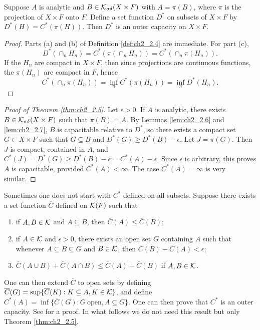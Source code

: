 \begin{lemma}\label{lem:ch2_2.7}
Suppose $A$ is analytic and $B \in \mathcal{K}_{\sigma\delta}(X \times F)$ with $A = \pi(B)$, where $\pi$ is the projection of $X \times F$ onto $F$. Define a set function $D^*$ on subsets of $X \times F$ by $D^*(H) = C^*(\pi(H))$. Then $D^*$ is an outer capacity on $X \times F$.
\end{lemma}

\begin{proof}
Parts (a) and (b) of Definition \ref{def:ch2_2.4} are immediate. For part (c),
\[
    D^*(\cap_n H_n) = C^*(\pi(\cap_n H_n)) = C^*(\cap_n \pi(H_n)).
\]
If the $H_n$ are compact in $X \times F$, then since projections are continuous functions, the $\pi(H_n)$ are compact in $F$, hence
\[
    C^*(\cap_n \pi(H_n)) = \inf_n C^*(\pi(H_n)) = \inf_n D^*(H_n).
\]
\end{proof}

\begin{proof}[Proof of Theorem \ref{thm:ch2_2.5}]
Let $\epsilon > 0$. If $A$ is analytic, there exists $B \in \mathcal{K}_{\sigma\delta}(X \times F)$ such that $\pi(B) = A$. By Lemmas \ref{lem:ch2_2.6} and \ref{lem:ch2_2.7}, $B$ is capacitable relative to $D^*$, so there exists a compact set $G \subset X \times F$ such that $G \subseteq B$ and $D^*(G) \geq D^*(B) - \epsilon$. Let $J = \pi(G)$. Then $J$ is compact, contained in $A$, and $C^*(J) = D^*(G) \geq D^*(B) - \epsilon = C^*(A) - \epsilon$. Since $\epsilon$ is arbitrary, this proves $A$ is capacitable, provided $C^*(A) < \infty$. The case $C^*(A) = \infty$ is very similar.
\end{proof}

Sometimes one does not start with $C^*$ defined on all subsets. Suppose there exists a set function $\overline{C}$ defined on $\mathcal{K}(F)$ such that
\begin{enumerate}
    \item if $A,B \in \mathcal{K}$ and $A \subseteq B$, then $\overline{C}(A) \leq \overline{C}(B)$;
    \item if $A \in \mathcal{K}$ and $\epsilon > 0$, there exists an open set $G$ containing $A$ such that whenever $A \subseteq B \subseteq G$ and $B \in \mathcal{K}$, then $\overline{C}(B) - \overline{C}(A) < \epsilon$;
    \item $\overline{C}(A \cup B) + \overline{C}(A \cap B) \leq \overline{C}(A) + \overline{C}(B)$ if $A,B \in \mathcal{K}$.
\end{enumerate}

One can then extend $\overline{C}$ to open sets by defining $\overline{C}(G) = \sup\{\overline{C}(K) : K \subseteq A, K \in \mathcal{K}\}$, and define $C^*(A) = \inf\{\overline{C}(G) : G~\text{open}, A \subseteq G\}$. One can then prove that $C^*$ is an outer capacity. See \cite{BlumenthalGetoor1968} for a proof. In what follows we do not need this result but only Theorem \ref{thm:ch2_2.5}.

